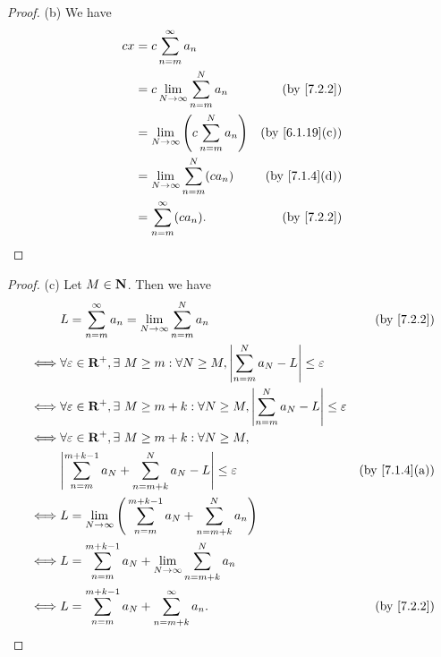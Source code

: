 \begin{proof}{(b)}
  We have
  \begin{align*}
    cx & = c \sum_{n = m}^\infty a_n                                                           \\
       & = c \lim_{N \to \infty} \sum_{n = m}^N a_n             & \text{(by \cref{7.2.2})}     \\
       & = \lim_{N \to \infty} \Bigg(c \sum_{n = m}^N a_n\Bigg) & \text{(by \cref{6.1.19}(c))} \\
       & = \lim_{N \to \infty} \sum_{n = m}^N (c a_n)           & \text{(by \cref{7.1.4}(d))}  \\
       & = \sum_{n = m}^\infty (c a_n).                         & \text{(by \cref{7.2.2})}
  \end{align*}
\end{proof}

\begin{proof}{(c)}
  Let \(M \in \mathbf{N}\).
  Then we have
  \begin{align*}
         & L = \sum_{n = m}^\infty a_n = \lim_{N \to \infty} \sum_{n = m}^N a_n                                                  & \text{(by \cref{7.2.2})}    \\
    \iff & \forall \varepsilon \in \R^+, \exists\ M \geq m : \forall N \geq M, \abs{\sum_{n = m}^N a_N - L} \leq \varepsilon                                   \\
    \iff & \forall \varepsilon \in \R^+, \exists\ M \geq m + k : \forall N \geq M, \abs{\sum_{n = m}^N a_N - L} \leq \varepsilon                               \\
    \iff & \forall \varepsilon \in \R^+, \exists\ M \geq m + k : \forall N \geq M,                                                                             \\
         & \abs{\sum_{n = m}^{m + k - 1} a_N + \sum_{n = m + k}^N a_N - L} \leq \varepsilon                                      & \text{(by \cref{7.1.4}(a))} \\
    \iff & L = \lim_{N \to \infty} \Bigg(\sum_{n = m}^{m + k - 1} a_N + \sum_{n = m + k}^N a_n\Bigg)                                                           \\
    \iff & L = \sum_{n = m}^{m + k - 1} a_N + \lim_{N \to \infty} \sum_{n = m + k}^N a_n                                                                       \\
    \iff & L = \sum_{n = m}^{m + k - 1} a_N + \sum_{n = m + k}^\infty a_n.                                                       & \text{(by \cref{7.2.2})}
  \end{align*}
\end{proof}

